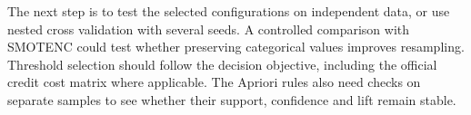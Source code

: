 The next step is to test the selected configurations on independent data, or use nested cross validation with several seeds. A controlled comparison with SMOTENC could test whether preserving categorical values improves resampling. Threshold selection should follow the decision objective, including the official credit cost matrix where applicable. The Apriori rules also need checks on separate samples to see whether their support, confidence and lift remain stable.
